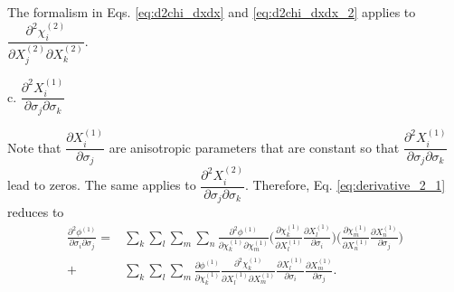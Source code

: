 \documentclass[12pt]{amsart}
\begin{document}
The formalism in Eqs. \ref{eq:d2chi_dxdx} and \ref{eq:d2chi_dxdx_2} applies to $\dfrac{\partial^2\chi_i^{(2)}}{\partial X_j^{(2)} \partial X_k^{(2)}}$.


c. $\dfrac{\partial^2 X^{(1)}_i}{\partial\sigma_j\partial\sigma_k}$

Note that $\dfrac{\partial X^{(1)}_i}{\partial\sigma_j}$ are anisotropic parameters that are constant so that $\dfrac{\partial^2 X^{(1)}_i}{\partial\sigma_j\partial\sigma_k}$ lead to zeros.
The same applies to $\dfrac{\partial^2 X^{(2)}_i}{\partial\sigma_j\partial\sigma_k}$.
Therefore, Eq. \ref{eq:derivative_2_1} reduces to
\begin{equation}
  \label{eq:derivative_2_4}
  \begin{split}
    \frac{\partial^2\phi^{(1)}}{\partial\sigma_i\partial\sigma_j}=&\sum_k \sum_l \sum_m \sum_n \frac{\partial^2\phi^{(1)}}{\partial\chi^{(1)}_k\partial\chi^{(1)}_m} \bigg( \frac{\partial\chi^{(1)}_k}{\partial X^{(1)}_l}    \frac{\partial X^{(1)}_l}{\partial \sigma_i}\bigg)  \bigg( \frac{\partial\chi^{(1)}_m}{\partial X^{(1)}_n}    \frac{\partial X^{(1)}_n}{\partial \sigma_j}\bigg)\\
    +&\sum_k \sum_l \sum_m \frac{\partial\phi^{(1)} }{\partial\chi^{(1)}_k}     \frac{\partial^2\chi^{(1)}_k}{\partial X^{(1)}_l \partial  X^{(1)}_m}   \frac{\partial X^{(1)}_l}{\partial\sigma_i}    \frac{\partial X^{(1)}_m}{\partial\sigma_j}.
  \end{split}
\end{equation}

\newpage



\end{document}
